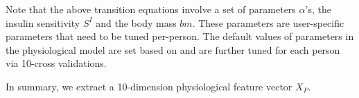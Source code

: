 
Note that the above transition equations involve a set of parameters $\alpha$'s, \eg the insulin sensitivity $S^I$ and the body mass $bm$.
These parameters are user-specific parameters that need to be tuned per-person.
The default values of parameters in the physiological model are set based on \cite{bib:duke2010intelligent} and are further tuned for each person via 10-cross validations.

In summary, we extract a 10-dimension physiological feature vector $X_P$.






